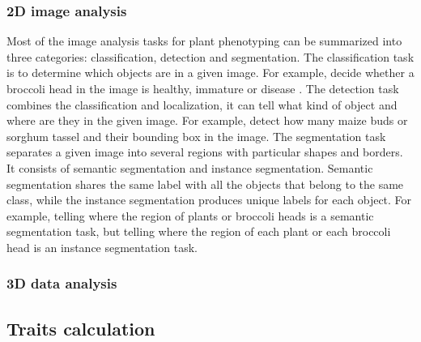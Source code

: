 \subsubsection{2D image analysis}

Most of the image analysis tasks for plant phenotyping can be summarized into three categories: classification, detection and segmentation. The classification task is to determine which objects are in a given image. For example, decide whether a broccoli head in the image is healthy, immature or disease \citep{garcia_towards_2021}. The detection task combines the classification and localization, it can tell what kind of object and where are they in the given image. For example, detect how many maize buds \citep{liu_estimating_2022} or sorghum tassel \citep{ghosal_weakly_2019} and their bounding box in the image. The segmentation task separates a given image into several regions with particular shapes and borders. It consists of semantic segmentation and instance segmentation. Semantic segmentation shares the same label with all the objects that belong to the same class, while the instance segmentation produces unique labels for each object. For example, telling where the region of plants or broccoli heads is a semantic segmentation task, but telling where the region of each plant or each broccoli head is an instance segmentation task.





\subsubsection{3D data analysis}





\subsection{Traits calculation}



